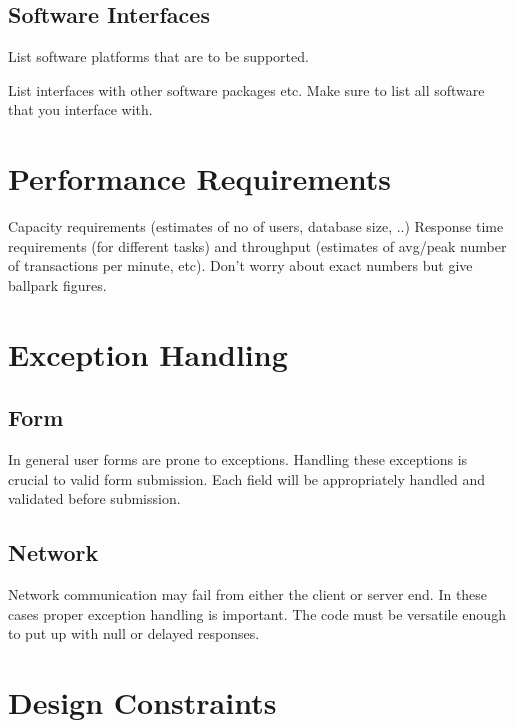 \documentclass[a4wide]{article}
\begin{document}
\subsection{Software Interfaces}

List software platforms that are to be supported.

List interfaces with other software packages etc.
Make sure to list all software that you interface with.



\section{Performance Requirements}

Capacity requirements (estimates of no of users, database size, ..)
Response time requirements (for different tasks)
and throughput (estimates of avg/peak number of transactions per minute, etc).
Don't worry about exact numbers but give ballpark figures.


\section{Exception Handling}

\subsection{Form}

In general user forms are prone to exceptions.
Handling these exceptions is crucial to valid form submission.
Each field will be appropriately handled and validated before submission.

\subsection{Network}

Network communication may fail from either the client or server end.
In these cases proper exception handling is important.
The code must be versatile enough to put up with null or delayed responses.



\section{Design Constraints}
\end{document}
